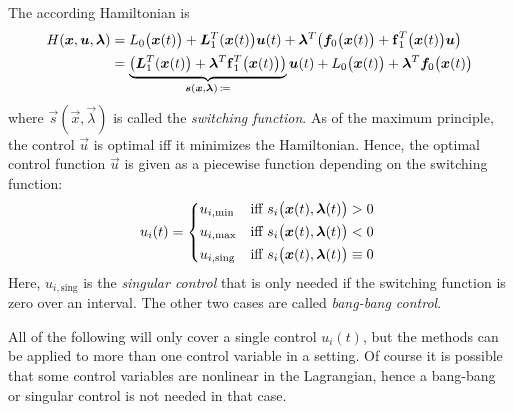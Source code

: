 		The according Hamiltonian is
		\begin{align*}
			H(\bm{x}, \bm{u}, \bm{\lambda})
			 & = L_0\big(\bm{x}(t)\big) + \bm{L}_1^T(\bm{x}(t)\big) \bm{u}(t) + \bm{\lambda}^T \big( \bm{f}_0\big(\bm{x}(t)\big) + \bm{\mathrm{f}}_1^T\big(\bm{x}(t)\big) \bm{u} \big)                                                                    \\
			 & = \underbrace{\big( \bm{L}_1^T(\bm{x}(t)\big) + \bm{\lambda}^T \bm{\mathrm{f}}_1^T\big(\bm{x}(t)\big) \big)}_{\bm{s}(\bm{x}, \bm{\lambda}) \,\coloneqq} \bm{u}(t) + L_0\big(\bm{x}(t)\big) + \bm{\lambda}^T \bm{f}_0\big(\bm{x}(t)\big)
		\end{align*}
		where \( \vec{s}(\vec{x}, \vec{\lambda}) \) is called the \emph{switching function}. As of the maximum principle, the control \(\vec{u}\) is optimal iff it minimizes the Hamiltonian. Hence, the optimal control function \(\vec{u}\) is given as a piecewise function depending on the switching function:
		\begin{align*}
			u_i(t) =
			\begin{cases*}
				u_{i, \mathrm{min}}  & iff \( s_i\big(\vec{x}(t), \vec{\lambda}(t)\big) > 0 \)      \\
				u_{i, \mathrm{max}}  & iff \( s_i\big(\vec{x}(t), \vec{\lambda}(t)\big) < 0 \)      \\
				u_{i, \mathrm{sing}} & iff \( s_i\big(\vec{x}(t), \vec{\lambda}(t)\big) \equiv 0 \) \\
			\end{cases*}
		\end{align*}
		Here, \( u_{i, \mathrm{sing}} \) is the \emph{singular control} that is only needed if the switching function is zero over an interval. The other two cases are called \emph{bang-bang control}.

		All of the following will only cover a single control \( u_i(t) \), but the methods can be applied to more than one control variable in a setting. Of course it is possible that some control variables are nonlinear in the Lagrangian, hence a bang-bang or singular control is not needed in that case.

